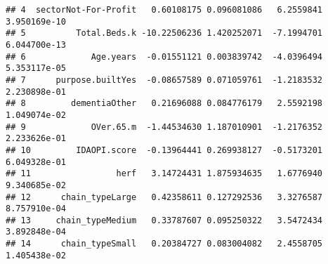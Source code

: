 \documentclass[]{article}
\newenvironment{Shaded}{\begin{snugshade}}{\end{snugshade}}
\newcommand{\KeywordTok}[1]{\textcolor[rgb]{0.13,0.29,0.53}{\textbf{{#1}}}}
\newcommand{\DataTypeTok}[1]{\textcolor[rgb]{0.13,0.29,0.53}{{#1}}}
\newcommand{\StringTok}[1]{\textcolor[rgb]{0.31,0.60,0.02}{{#1}}}
\newcommand{\NormalTok}[1]{{#1}}
\begin{document}
\begin{verbatim}
## 4  sectorNot-For-Profit   0.60108175 0.096081086   6.2559841  3.950169e-10
## 5          Total.Beds.k -10.22506236 1.420252071  -7.1994701  6.044700e-13
## 6             Age.years  -0.01551121 0.003839742  -4.0396494  5.353117e-05
## 7      purpose.builtYes  -0.08657589 0.071059761  -1.2183532  2.230898e-01
## 8         dementiaOther   0.21696088 0.084776179   2.5592198  1.049074e-02
## 9             OVer.65.m  -1.44534630 1.187010901  -1.2176352  2.233626e-01
## 10         IDAOPI.score  -0.13964441 0.269938127  -0.5173201  6.049328e-01
## 11                 herf   3.14724431 1.875934635   1.6776940  9.340685e-02
## 12      chain_typeLarge   0.42358611 0.127292536   3.3276587  8.757910e-04
## 13     chain_typeMedium   0.33787607 0.095250322   3.5472434  3.892848e-04
## 14      chain_typeSmall   0.20384727 0.083004082   2.4558705  1.405438e-02
\end{verbatim}

\begin{Shaded}
\end{Shaded}
\end{document}
